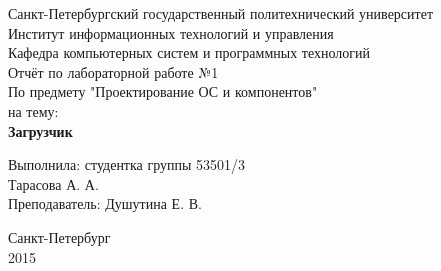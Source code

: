 \thispagestyle{empty}
\begin{center}
\large Санкт-Петербургский государственный политехнический университет\\
Институт информационных технологий и управления\\
Кафедра компьютерных систем и программных технологий\\
\vspace{65mm}
\Large Отчёт по лабораторной работе №1\\ По предмету "Проектирование ОС и компонентов" \\на тему:\\
\LARGE\textbf{Загрузчик}
\end{center}

\vspace{40mm}
\begin{flushright}
\large Выполнила: студентка группы 53501/3\\ Тарасова А. А.\\ Преподаватель: Душутина Е. В.
\end{flushright}
\vspace{30mm}

\begin{center}
Санкт-Петербург\\ 2015
\end{center}